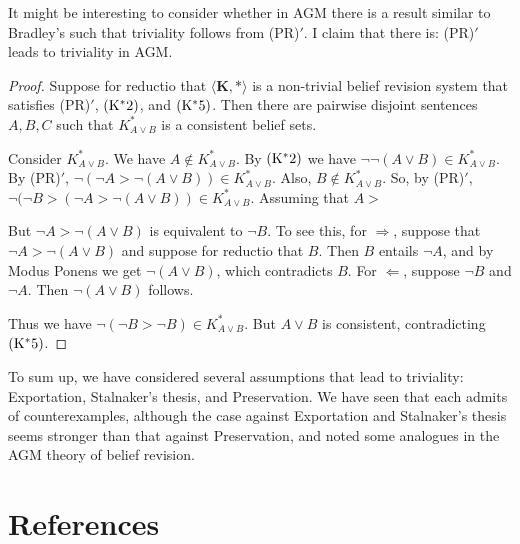 \documentclass[12pt]{article}
\begin{document}
It might be interesting to consider whether in AGM there is a result similar to Bradley's such that triviality follows from (PR)$'$. I claim that there is: (PR)$'$ leads to triviality in AGM.

\begin{proof}

Suppose for reductio that $\langle \mathbf{K}, * \rangle$ is a non-trivial belief revision system that satisfies (PR)$'$, $\pst{*2}$, and $\pst{*5}$. Then there are pairwise disjoint sentences $A,B,C$ such that $K_{A\lor B}^*$ is a consistent belief sets.

Consider $K_{A\lor B}^*$. We have $A \not\in K_{A\lor B}^*$. By $\pst{*2}$ we have $\neg\neg(A\lor B) \in K_{A\lor B}^*$. By (PR)$'$, $\neg (\neg A>\neg(A\lor B))\in K_{A\lor B}^*$. Also, $B\not\in K_{A\lor B}^*$. So, by (PR)$'$, $\neg(\neg B > (\neg A > \neg(A\lor B)) \in K_{A\lor B}^*$. Assuming that $A>$

But $\neg A > \neg(A\lor B)$ is equivalent to $\neg B$. To see this, for $\Rightarrow$, suppose that $\neg A > \neg(A\lor B)$ and suppose for reductio that $B$. Then $B$ entails $\neg A$, and by Modus Ponens we get $\neg(A\lor B)$, which contradicts $B$. For $\Leftarrow$, suppose $\neg B$ and $\neg A$. Then $\neg(A\lor B)$ follows.

Thus we have $\neg(\neg B > \neg B) \in K_{A\lor B}^*$. But $A\lor B$ is consistent, contradicting $\pst{*5}$.
\end{proof}

To sum up, we have considered several assumptions that lead to triviality: Exportation, Stalnaker's thesis, and Preservation. We have seen that each admits of counterexamples, although the case against Exportation and Stalnaker's thesis seems stronger than that against Preservation, and noted some analogues in the AGM theory of belief revision.

\section*{References}
\end{document}
